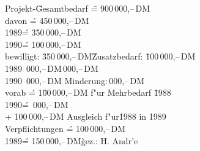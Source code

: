 \documentclass{article}
\begin{document}
\begin{tabbing}
Projekt-\=Gesamtbedarf \= = 900\,000,--\,DM \+\\
  davon \'= 450\,000,--\,DM \+\\
  1989\' = 350\,000,--\,DM \\ 1990\' = 100\,000,--\,DM\-\\[0.5ex]  bewilligt: \=350\,000,--\,DM\quad\= Zusatzbedarf: \= 100\,000,--\,DM\\
  1989 \,000,--\,DM\>\,000,--\,DM\\
  1990 \,000,--\,DM\> Minderung:\,000,--\,DM\\[0.5ex] \poptabs 
vorab \' = 1\=00\,000,--\,DM f"ur Mehrbedarf \= 1988 \+\\
	 1990\' = \,000,--\,DM                  \\
		+ 100\,000,--\,DM \>\>Ausgleich f"ur\'1988 in 1989\-\-\\[0.5ex]
Verpflichtungen \>\'= 100\,000,--\,DM\+\+\\
1989\'= 150\,000,--\,DM\` gez.: H. Andr\a'e
\end{tabbing}
\end{document}
